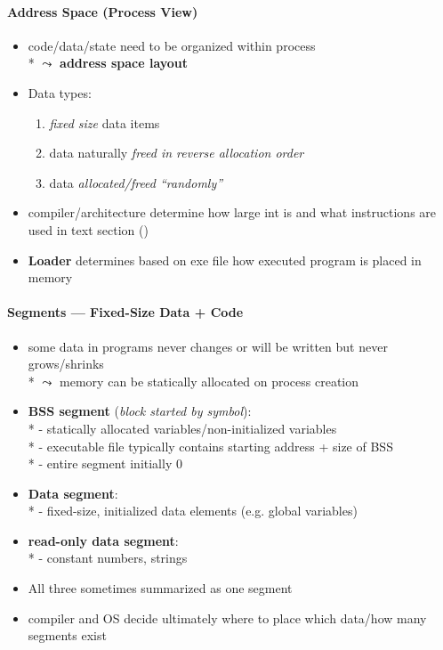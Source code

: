 \paragraph{Address Space (Process View)}
\begin{itemize}
	\item code/data/state need to be organized within process \\*
		\( \leadsto \) \textbf{address space layout}
	\item Data types:
	\begin{enumerate}
		\item \emph{fixed size} data items
		\item data naturally \emph{freed in reverse allocation order}
		\item data \emph{allocated/freed "`randomly"'}
	\end{enumerate}
	\item compiler/architecture determine how large int is and what instructions are used in text section ()
	\item \textbf{Loader} determines based on exe file how executed program is placed in memory
\end{itemize}

\paragraph{Segments --- Fixed-Size Data + Code}
\begin{itemize}
	\item some data in programs never changes or will be written but never grows/shrinks \\*
		\( \leadsto \) memory can be statically allocated on process creation
	\item \textbf{BSS segment} (\emph{block started by symbol}): \\*
		- statically allocated variables/non-initialized variables \\*
		- executable file typically contains starting address + size of BSS \\*
		- entire segment initially 0
	\item \textbf{Data segment}: \\*
		- fixed-size, initialized data elements (e.g. global variables)
	\item \textbf{read-only data segment}: \\*
		- constant numbers, strings
	\item All three sometimes summarized as one segment
	\item compiler and OS decide ultimately where to place which data/how many segments exist
\end{itemize}

